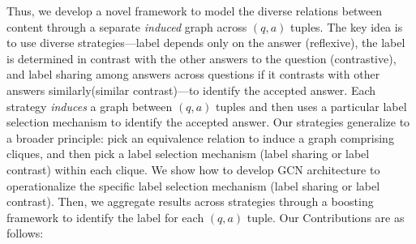 Thus, we develop a novel framework to model the diverse relations between content through a separate \textit{induced} graph across $(q,a)$ tuples. The key idea is to use diverse strategies---label depends only on the answer (reflexive), the label is determined in contrast with the other answers to the question (contrastive), and label sharing among answers across questions if it contrasts with other answers similarly(similar contrast)---to identify the accepted answer.
Each strategy \textit{induces} a graph between $(q,a)$ tuples and then uses a particular label selection mechanism to identify the accepted answer. Our strategies generalize to a broader principle: pick an equivalence relation to induce a graph comprising cliques, and then pick a label selection mechanism (label sharing or label contrast) within each clique. We show how to develop GCN architecture to operationalize the specific label selection mechanism (label sharing or label contrast). Then, we aggregate results across strategies through a boosting framework to identify the label for each $(q,a)$ tuple. Our Contributions are as follows:
